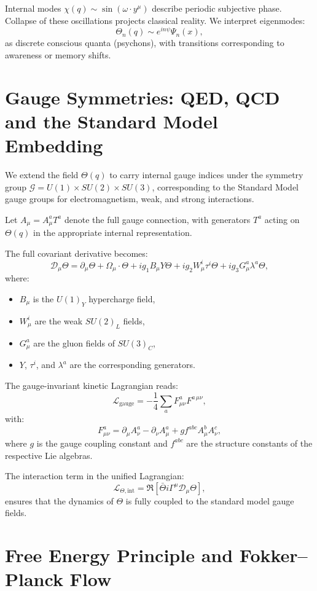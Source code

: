 \documentclass[12pt]{article}
\begin{document}
Internal modes \( \chi(q) \sim \sin(\omega \cdot y^\mu) \) describe periodic subjective phase. Collapse of these oscillations projects classical reality. We interpret eigenmodes:
\[
\Theta_n(q) \sim e^{i n \psi} \Psi_n(x),
\]
as discrete conscious quanta (psychons), with transitions corresponding to awareness or memory shifts.


\section{Gauge Symmetries: QED, QCD and the Standard Model Embedding}

We extend the field \(\Theta(q)\) to carry internal gauge indices under the symmetry group \( \mathcal{G} = U(1) \times SU(2) \times SU(3) \), corresponding to the Standard Model gauge groups for electromagnetism, weak, and strong interactions.

Let \(A_\mu = A_\mu^a T^a\) denote the full gauge connection, with generators \(T^a\) acting on \(\Theta(q)\) in the appropriate internal representation.

The full covariant derivative becomes:
\[
\mathcal{D}_\mu \Theta = \partial_\mu \Theta + \Omega_\mu \cdot \Theta + i g_1 B_\mu Y \Theta + i g_2 W_\mu^i \tau^i \Theta + i g_3 G_\mu^a \lambda^a \Theta,
\]
where:
\begin{itemize}
  \item \(B_\mu\) is the \(U(1)_Y\) hypercharge field,
  \item \(W_\mu^i\) are the weak \(SU(2)_L\) fields,
  \item \(G_\mu^a\) are the gluon fields of \(SU(3)_C\),
  \item \(Y\), \(\tau^i\), and \(\lambda^a\) are the corresponding generators.
\end{itemize}

The gauge-invariant kinetic Lagrangian reads:
\[
\mathcal{L}_{\text{gauge}} = -\frac{1}{4} \sum_a F^{a}_{\mu\nu} F^{a\,\mu\nu},
\]
with:
\[
F^a_{\mu\nu} = \partial_\mu A^a_\nu - \partial_\nu A^a_\mu + g f^{abc} A^b_\mu A^c_\nu,
\]
where \(g\) is the gauge coupling constant and \(f^{abc}\) are the structure constants of the respective Lie algebras.

The interaction term in the unified Lagrangian:
\[
\mathcal{L}_{\Theta, \text{int}} = \Re \left[ \bar{\Theta} i \Gamma^\mu \mathcal{D}_\mu \Theta \right],
\]
ensures that the dynamics of \(\Theta\) is fully coupled to the standard model gauge fields.


\section{Free Energy Principle and Fokker–Planck Flow}
\end{document}
